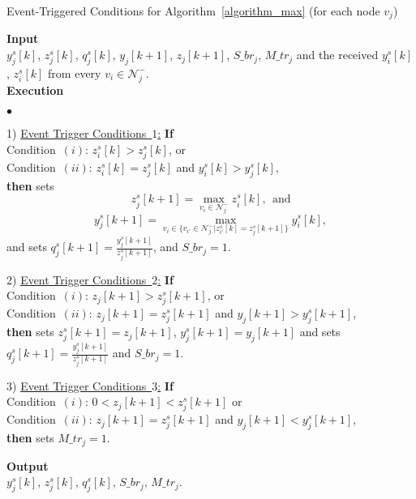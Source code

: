 \documentclass[twocolumn]{autart}    %
\newenvironment{varalgorithm}[1]
  {\algorithm\renewcommand{\thealgorithm}{#1}}
  {\endalgorithm}
\newenvironment{list4}{
	\begin{list}{$\bullet$}{%
			\setlength{\itemsep}{0.05cm}
			\setlength{\labelsep}{0.2cm}
			\setlength{\labelwidth}{0.3cm}
			\setlength{\parsep}{0in} 
			\setlength{\parskip}{0in}
			\setlength{\topsep}{0in} 
			\setlength{\partopsep}{0in}
			\setlength{\leftmargin}{0.16in}}}
	{\end{list}}
\begin{document}
\noindent
\vspace{-0.5cm}    
\begin{varalgorithm}{1.A}
\caption{Event-Triggered Conditions for Algorithm~\ref{algorithm_max} (for each node $v_j$)}
\textbf{Input} 
\\ $y^s_j[k]$, $z^s_j[k]$, $q^s_j[k]$, $y_j[k+1]$, $z_j[k+1]$, $S\_br_j$, $M\_tr_j$ and the received $y^s_i[k]$, $z^s_i[k]$ from every $v_i \in \mathcal{N}_j^-$.
\\
\textbf{Execution} 
\begin{list4}
\item[1)] \underline{Event Trigger Conditions~$1$:} \textbf{If} 
\\ Condition~$(i)$: $z^s_i[k] > z^s_j[k]$, or
\\ Condition~$(ii)$: $z^s_i[k] = z^s_j[k]$ and $y^s_i[k] > y^s_j[k]$, 
\\ \textbf{then} sets 
$$ 
z^s_j[k+1] = \max_{v_i \in \mathcal{N}_j^-} z^s_i[k] , \ \ \text{and}
$$ 
$$ 
y^s_j[k+1] = \max_{v_i \in \{v_{i'} \in \mathcal{N}_j^- | z^s_{i'}[k] = z^s_j[k+1]\}} y^s_i[k] ,
$$ 
and sets $q^s_j[k+1] = \frac{y^s_j[k+1]}{z^s_j[k+1]}$, and $S\_br_j = 1$. 
\item[2)] \underline{Event Trigger Conditions~$2$:} \textbf{If}
\\ Condition~$(i)$: $z_j[k+1] > z^s_j[k+1]$, or 
\\ Condition~$(ii)$: $z_j[k+1] = z^s_j[k+1]$ and $y_j[k+1] > y^s_j[k+1]$, 
\\ \textbf{then} sets $z^s_j[k+1] = z_j[k+1]$, $y^s_j[k+1] = y_j[k+1]$ and sets $q^s_j[k+1] = \frac{y^s_j[k+1]}{z^s_j[k+1]}$ and $S\_br_j = 1$.
\item[3)] \underline{Event Trigger Conditions~$3$:} \textbf{If}
\\ Condition~$(i)$: $0 < z_j[k+1] < z^s_j[k+1]$ or 
\\ Condition~$(ii)$: $z_j[k+1] = z^s_j[k+1]$ and $y_j[k+1] < y^s_j[k+1]$, 
\\ \textbf{then} sets $M\_tr_j = 1$.
\end{list4}
\textbf{Output} 
\\ $y^s_j[k]$, $z^s_j[k]$, $q^s_j[k]$, $S\_br_j$, $M\_tr_j$.
\label{algorithm_max_1a}
\end{varalgorithm}


\vspace{.1cm}
\end{document}
